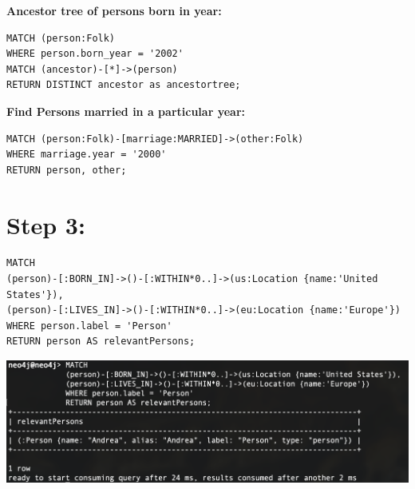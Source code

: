 \documentclass[14pt,a4paper]{extarticle}
\begin{document}
	\pagebreak

	\noindent \textbf{Ancestor tree of persons born in year:}
	\begin{lstlisting}[style=sql]
MATCH (person:Folk)
WHERE person.born_year = '2002'
MATCH (ancestor)-[*]->(person)
RETURN DISTINCT ancestor as ancestortree;
	\end{lstlisting}

	\noindent \textbf{Find Persons married in a particular year:}
	\begin{lstlisting}[style=sql]
MATCH (person:Folk)-[marriage:MARRIED]->(other:Folk)
WHERE marriage.year = '2000'
RETURN person, other;
	\end{lstlisting}



	



	\section*{Step 3:}
	\begin{lstlisting}[style=sql]
MATCH
(person)-[:BORN_IN]->()-[:WITHIN*0..]->(us:Location {name:'United States'}),
(person)-[:LIVES_IN]->()-[:WITHIN*0..]->(eu:Location {name:'Europe'})
WHERE person.label = 'Person'
RETURN person AS relevantPersons;
	\end{lstlisting}
	\includegraphics[width=\textwidth]{images/sc-step3.png}
\end{document}
